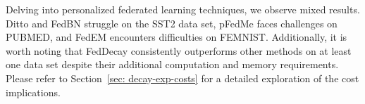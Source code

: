 Delving into personalized federated learning techniques, we observe mixed results.
Ditto and FedBN struggle on the SST2 data set, pFedMe faces challenges on PUBMED, and FedEM encounters difficulties on FEMNIST.
Additionally, it is worth noting that FedDecay consistently outperforms other methods on at least one data set despite their additional computation and memory requirements.
Please refer to Section~\ref{sec: decay-exp-costs} for a detailed exploration of the cost implications.
